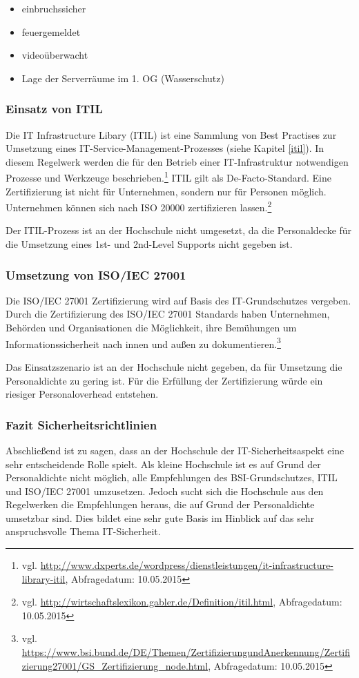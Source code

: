 \begin{itemize}
	\item einbruchssicher
	\item feuergemeldet
	\item videoüberwacht
	\item Lage der Serverräume im 1. OG (Wasserschutz)
\end{itemize}

\subsubsection{Einsatz von ITIL}
Die IT Infrastructure Libary (ITIL) ist eine Sammlung von Best Practises zur Umsetzung eines IT-Service-Management-Prozesses (siehe Kapitel \ref{itil}). In diesem Regelwerk werden die für den Betrieb einer IT-Infrastruktur notwendigen Prozesse und Werkzeuge beschrieben.\footnote{vgl. \url{http://www.dxperts.de/wordpress/dienstleistungen/it-infrastructure-library-itil}, Abfragedatum: 10.05.2015} ITIL gilt als De-Facto-Standard. Eine Zertifizierung ist nicht für Unternehmen, sondern nur für Personen möglich. Unternehmen können sich nach ISO 20000 zertifizieren lassen.\footnote{vgl. \url{http://wirtschaftslexikon.gabler.de/Definition/itil.html}, Abfragedatum: 10.05.2015}

Der ITIL-Prozess ist an der Hochschule nicht umgesetzt, da die Personaldecke für die Umsetzung eines 1st- und 2nd-Level Supports nicht gegeben ist.

\subsubsection{Umsetzung von ISO/IEC 27001}
Die ISO/IEC 27001 Zertifizierung wird auf Basis des IT-Grundschutzes vergeben. Durch die Zertifizierung des ISO/IEC 27001 Standards haben Unternehmen, Behörden und Organisationen die Möglichkeit, ihre Bemühungen um Informationssicherheit nach innen und außen zu dokumentieren.\footnote{vgl. \url{https://www.bsi.bund.de/DE/Themen/ZertifizierungundAnerkennung/Zertifizierung27001/GS_Zertifizierung_node.html}, Abfragedatum: 10.05.2015}

Das Einsatzszenario ist an der Hochschule nicht gegeben, da für Umsetzung die Personaldichte zu gering ist. Für die Erfüllung der Zertifizierung würde ein riesiger Personaloverhead entstehen.

\subsubsection{Fazit Sicherheitsrichtlinien}
Abschließend ist zu sagen, dass an der Hochschule der IT-Sicherheitsaspekt eine sehr entscheidende Rolle spielt. Als kleine Hochschule ist es auf Grund der Personaldichte nicht möglich, alle Empfehlungen des BSI-Grundschutzes, ITIL und ISO/IEC 27001 umzusetzen. Jedoch sucht sich die Hochschule aus den Regelwerken die Empfehlungen heraus, die auf Grund der Personaldichte umsetzbar sind. Dies bildet eine sehr gute Basis im Hinblick auf das sehr anspruchsvolle Thema IT-Sicherheit.


